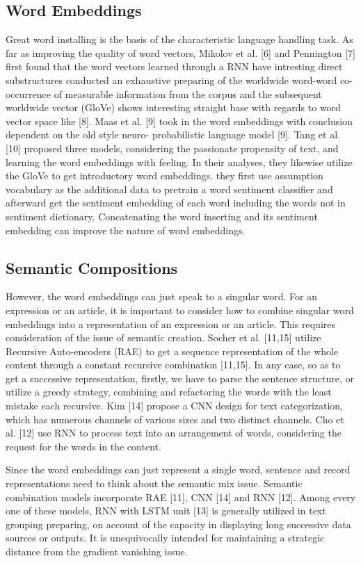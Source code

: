 \documentclass[sigplan,screen]{acmart}
\begin{document}
\subsection{Word Embeddings}
Great word installing is the basis of the characteristic language handling task. As far as improving the quality of word vectors, Mikolov et al. [6] and Pennington [7] first found that the word vectors learned through a RNN have intresting direct substructures conducted an exhaustive preparing of the worldwide word-word co-occurrence of measurable information from the corpus and the subsequent worldwide vector (GloVe) shows interesting straight base with regards to word vector space like [8]. Maas et al. [9] took in the word embeddings with conclusion dependent on the old style neuro- probabilistic language model [9]. Tang et al. [10] proposed three models, considering the passionate propensity of text, and learning the word embeddings with feeling. In their analyses, they likewise utilize the GloVe to get introductory word embeddings. they first use assumption vocabulary as the additional data to pretrain a word sentiment classifier and afterward get the sentiment embedding of each word including the words not in sentiment dictionary. Concatenating the word inserting and its sentiment embedding can improve the nature of word embeddings. 

\subsection{Semantic Compositions}
However, the word embeddings can just speak to a singular word. For an expression or an article, it is important to consider how to combine singular word embeddings into a representation of an expression or an article. This requires consideration of the issue of semantic creation. Socher et al. [11,15] utilize Recursive Auto-encoders (RAE) to get a sequence representation of the whole content through a constant recursive combination [11,15]. In any case, so as to get a successive representation, firstly, we have to parse the sentence structure, or utilize a greedy strategy, combining and refactoring the words with the least mistake each recursive. Kim [14] propose a CNN design for text categorization, which has numerous channels of various sizes and two distinct channels. Cho et al. [12] use RNN to process text into an arrangement of words, considering the request for the words in the content.


Since the word embeddings can just represent a single word, sentence and record representations need to think about the semantic mix issue. Semantic combination models incorporate RAE [11], CNN [14] and RNN [12]. Among every one of these models, RNN with LSTM unit [13] is generally utilized in text grouping preparing, on account of the capacity in displaying long successive data sources or outputs. It is unequivocally intended for maintaining a strategic distance from the gradient vanishing issue.
\end{document}
